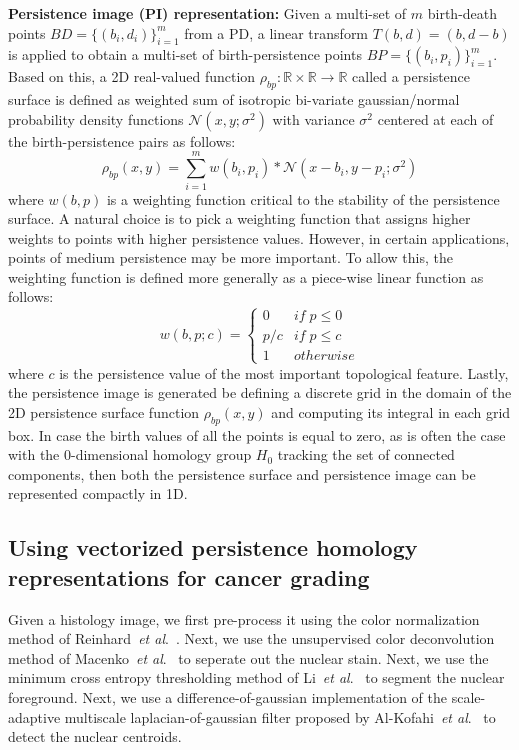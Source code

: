 \documentclass{article}
\newcommand{\etal}{~\textit{et al}.}
\begin{document}
\smallskip
\noindent \textbf{Persistence image (PI) representation:} Given a multi-set of $m$ birth-death points $BD=\{(b_i, d_i)\}_{i=1}^{m}$ from a PD, a linear transform $T(b, d) = (b, d-b)$ is applied to obtain a multi-set of birth-persistence points $BP=\{(b_i, p_i)\}_{i=1}^{m}$. Based on this, a 2D real-valued function $\rho_{bp} : \mathbb{R} \times \mathbb{R} \to \mathbb{R}$ called a persistence surface is defined as weighted sum of isotropic bi-variate gaussian/normal probability density functions $\mathcal{N}\left(x, y; \sigma^2\right)$ with variance $\sigma^2$ centered at each of the birth-persistence pairs as follows:
\begin{equation}
\rho_{bp}(x, y) = \sum_{i=1}^{m} w(b_i,p_i) * \mathcal{N}\left(x - b_i, y - p_i; \sigma^{2}\right)
\end{equation}
where $w(b, p)$ is a weighting function critical to the stability of the persistence surface. A natural choice is to pick a weighting function that assigns higher weights to points with higher persistence values. However, in certain applications, points of medium persistence may be more important. To allow this, the weighting function is defined more generally as a piece-wise linear function as follows:
\begin{equation}
w(b, p; c) = \left\{\begin{array}{ll}
 0 & if \; p \leq 0\\ 
 p / c & if \; p \leq c\\ 
 1 & otherwise
\end{array}\right.    
\end{equation}
where $c$ is the persistence value of the most important topological feature. Lastly, the persistence image is generated be defining a discrete grid in the domain of the 2D persistence surface function $\rho_{bp}(x, y)$ and computing its integral in each grid box. In case the birth values of all the points is equal to zero, as is often the case with the 0-dimensional homology group $H_0$ tracking the set of connected components, then both the persistence surface and persistence image can be represented compactly in 1D.  

\subsection{Using vectorized persistence homology representations for cancer grading}
\label{sec:method:proposed}

Given a histology image, we first pre-process it using the color normalization method of Reinhard\etal~\cite{Reinhard2001}. Next, we use the unsupervised color deconvolution method of Macenko\etal~\cite{Macenko2009} to seperate out the nuclear stain. Next, we use the minimum cross entropy thresholding method of Li\etal~\cite{Li1998} to segment the nuclear foreground. Next, we use a difference-of-gaussian implementation of the scale-adaptive multiscale laplacian-of-gaussian filter proposed by Al-Kofahi\etal~\cite{Al-Kofahi2010} to detect the nuclear centroids.
\end{document}
